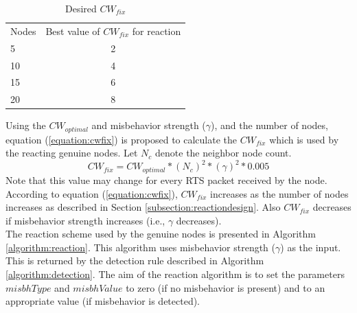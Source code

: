 \documentclass[12pt,letterpaper,english]{article}
\begin{document}
\begin{table}[H]
\caption{Desired $CW_{fix}$}
\label{table:desiredcwfix}
\begin{center}
\begin{tabular}{l c}
\hline
\hline
Nodes & Best value of $CW_{fix}$ for reaction\\
5 & 2\\
10 & 4\\
15 & 6\\
20 & 8\\
\hline
\end{tabular}
\end{center}
\end{table}
\indent Using the $CW_{optimal}$ and misbehavior strength ($\gamma$), and the number of nodes, equation (\ref{equation:cwfix}) is proposed to calculate the $CW_{fix}$ which is used by the reacting genuine nodes. Let $N_{c}$ denote the neighbor node count.
\begin{equation}
\label{equation:cwfix}
CW_{fix} = CW_{optimal} * (N_{c})^2 * (\gamma)^2 * 0.005
\end{equation}
Note that this value may change for every RTS packet received by the node. According to equation (\ref{equation:cwfix}), $CW_{fix}$ increases as the number of nodes increases as described in Section \ref{subsection:reactiondesign}. Also $CW_{fix}$ decreases if misbehavior strength increases (i.e., $\gamma$ decreases).
\\
\indent The reaction scheme used by the genuine nodes is presented in Algorithm \ref{algorithm:reaction}. This algorithm uses misbehavior strength ($\gamma$) as the input. This is returned by the detection rule described in Algorithm \ref{algorithm:detection}. 
The aim of the reaction algorithm is to set the parameters $misbhType$ and $misbhValue$ to zero (if no misbehavior is present) and to an appropriate value (if misbehavior is detected).
\end{document}
